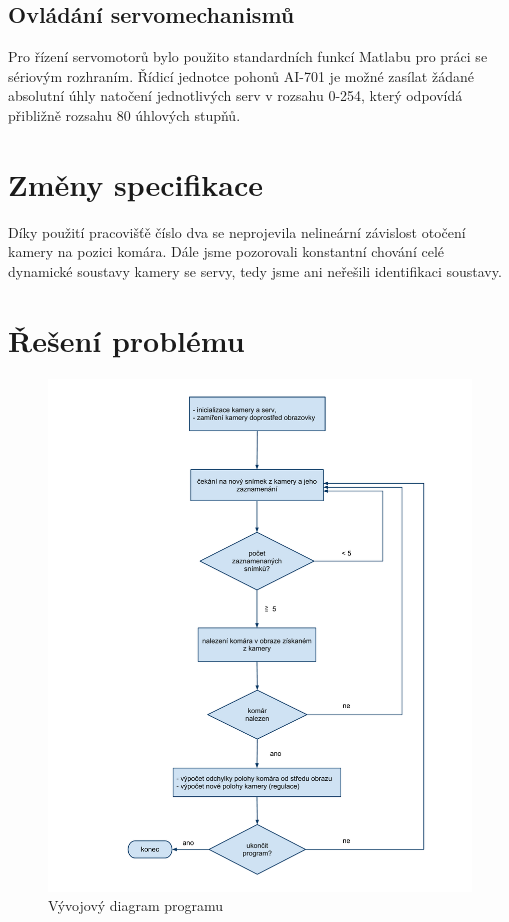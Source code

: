 \documentclass[a4paper,10pt]{article}
\begin{document}
	\subsection{Ovládání servomechanismů}

		Pro řízení servomotorů bylo použito standardních funkcí Matlabu pro práci se sériovým rozhraním.
		Řídicí jednotce pohonů AI-701 je možné zasílat žádané absolutní úhly natočení jednotlivých serv
		v rozsahu 0-254, který odpovídá přibližně rozsahu 80 úhlových stupňů.

\section{Změny specifikace}

		Díky použití pracovišťě číslo dva se neprojevila nelineární závislost otočení kamery na pozici komára. 
		Dále jsme pozorovali konstantní chování celé dynamické soustavy kamery se servy, tedy jsme ani neřešili 
		identifikaci soustavy.
		
\section{Řešení problému}

		\begin{figure}[!h]
			\centering
			 \includegraphics[width=1\columnwidth]{pics/vyvojovy_diagram_programu}
			 \caption{Vývojový diagram programu}\label{fig:Diagram_programu}
		\end{figure}
\end{document}
